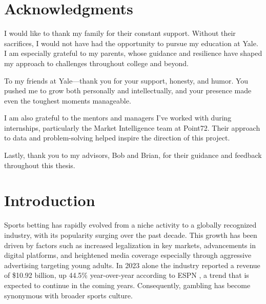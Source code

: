 \documentclass[12pt,twoside]{report}
\begin{document}
\chapter*{Acknowledgments}

I would like to thank my family for their constant support. Without their sacrifices, I would not have had the opportunity to pursue my education at Yale. I am especially grateful to my parents, whose guidance and resilience have shaped my approach to challenges throughout college and beyond.

To my friends at Yale---thank you for your support, honesty, and humor. You pushed me to grow both personally and intellectually, and your presence made even the toughest moments manageable.

I am also grateful to the mentors and managers I’ve worked with during internships, particularly the Market Intelligence team at Point72. Their approach to data and problem-solving helped inspire the direction of this project.

Lastly, thank you to my advisors, Bob and Brian, for their guidance and feedback throughout this thesis.






\singlespacing
{}
\tableofcontents

\listoffigures

\listoftables


\normalsize
\newpage
{}
\onehalfspacing

\cleardoublepage\chapter{Introduction}\label{introduction}

Sports betting has rapidly evolved from a niche activity to a globally recognized industry, with its popularity surging over the past decade. This growth has been driven by factors such as increased legalization in key markets, advancements in digital platforms, and heightened media coverage especially through aggressive advertising targeting young adults. In 2023 alone the industry reported a revenue of \$10.92 billion, up 44.5\% year-over-year according to ESPN \citep{greenberg_2024}, a trend that is expected to continue in the coming years. 
Consequently, gambling has become synonymous with broader sports culture.
\end{document}
